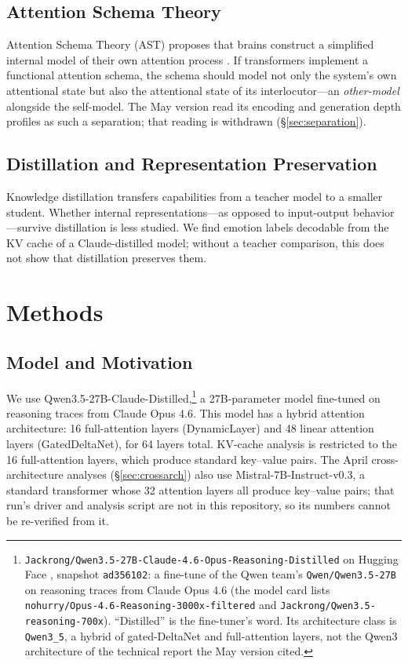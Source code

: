 \documentclass[11pt,a4paper]{article}
\begin{document}
\subsection{Attention Schema Theory}

Attention Schema Theory (AST) proposes that brains construct a simplified internal model of their own attention process \citep{graziano2017attention}. If transformers implement a functional attention schema, the schema should model not only the system's own attentional state but also the attentional state of its interlocutor---an \emph{other-model} alongside the self-model. The May version read its encoding and generation depth profiles as such a separation; that reading is withdrawn (\S\ref{sec:separation}).

\subsection{Distillation and Representation Preservation}

Knowledge distillation \citep{hinton2015distilling} transfers capabilities from a teacher model to a smaller student. Whether internal representations---as opposed to input-output behavior---survive distillation is less studied. We find emotion labels decodable from the KV cache of a Claude-distilled model; without a teacher comparison, this does not show that distillation preserves them.

\section{Methods}

\subsection{Model and Motivation}

We use Qwen3.5-27B-Claude-Distilled,\footnote{\texttt{Jackrong/Qwen3.5-27B-Claude-4.6-Opus-Reasoning-Distilled} on Hugging Face \citep{qwen35distilled}, snapshot \texttt{ad356102}: a fine-tune of the Qwen team's \texttt{Qwen/Qwen3.5-27B} \citep{qwen35base} on reasoning traces from Claude Opus 4.6 (the model card lists \texttt{nohurry/Opus-4.6-Reasoning-3000x-filtered} and \texttt{Jackrong/Qwen3.5-reasoning-700x}). ``Distilled'' is the fine-tuner's word. Its architecture class is \texttt{Qwen3\_5}, a hybrid of gated-DeltaNet and full-attention layers, not the Qwen3 architecture of the technical report the May version cited.} a 27B-parameter model fine-tuned on reasoning traces from Claude Opus 4.6. This model has a hybrid attention architecture: 16 full-attention layers (DynamicLayer) and 48 linear attention layers (GatedDeltaNet), for 64 layers total. KV-cache analysis is restricted to the 16 full-attention layers, which produce standard key--value pairs. The April cross-architecture analyses (\S\ref{sec:crossarch}) also use Mistral-7B-Instruct-v0.3, a standard transformer whose 32 attention layers all produce key--value pairs; that run's driver and analysis script are not in this repository, so its numbers cannot be re-verified from it.
\end{document}
